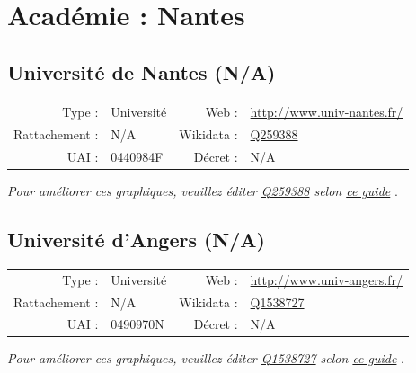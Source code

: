 \documentclass[12pt,french,landscape]{article}
\begin{document}
\newpage

\hypertarget{acaduxe9mie-nantes}{%
\section{Académie : Nantes}\label{acaduxe9mie-nantes}}

\hypertarget{universituxe9-de-nantes-na}{%
\subsection{Université de Nantes
(N/A)}\label{universituxe9-de-nantes-na}}

\begin{tabular*}{0.45\textwidth}{rp{2cm}rl}  
\hline  
Type : & Université & Web : &\href{http://www.univ-nantes.fr/}{http://www.univ-nantes.fr/} \\  
Rattachement : & N/A & Wikidata : & \href{https://www.wikidata.org/entity/Q259388}{Q259388} \\  
UAI : & 0440984F & Décret : & N/A \\  
\hline  
\end{tabular*}

\textit{\scriptsize Pour améliorer ces graphiques, veuillez éditer \href{https://www.wikidata.org/entity/Q259388}{Q259388}  selon \href{https://github.com/cpesr/wikidataESR/blob/master/Rmd/wikidataESR.md}{ce guide}}
.


\newpage

\hypertarget{universituxe9-dangers-na}{%
\subsection{Université d'Angers (N/A)}\label{universituxe9-dangers-na}}

\begin{tabular*}{0.45\textwidth}{rp{2cm}rl}  
\hline  
Type : & Université & Web : &\href{http://www.univ-angers.fr/}{http://www.univ-angers.fr/} \\  
Rattachement : & N/A & Wikidata : & \href{https://www.wikidata.org/entity/Q1538727}{Q1538727} \\  
UAI : & 0490970N & Décret : & N/A \\  
\hline  
\end{tabular*}

\textit{\scriptsize Pour améliorer ces graphiques, veuillez éditer \href{https://www.wikidata.org/entity/Q1538727}{Q1538727}  selon \href{https://github.com/cpesr/wikidataESR/blob/master/Rmd/wikidataESR.md}{ce guide}}
.
\end{document}
